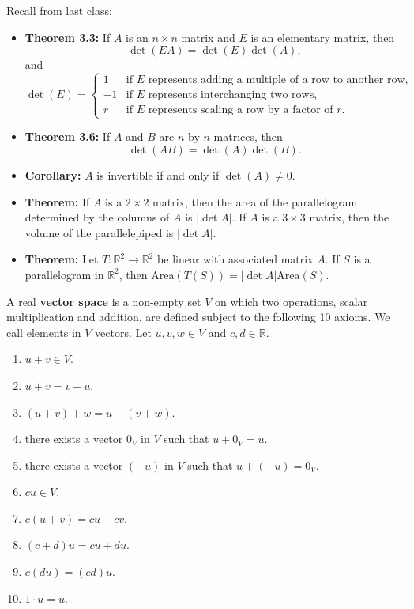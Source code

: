 \documentclass[12pt,letterpaper]{article}
\begin{document}
\thispagestyle{fancy}

Recall from last class:

\begin{itemize}
\item {\bf Theorem 3.3:} If $A$ is an $n\times n$ matrix and $E$ is an elementary matrix, then $$\operatorname{det}(EA)=\operatorname{det}(E) \operatorname{det}(A),$$ and 
$$\operatorname{det}(E)=\begin{cases}
1 & \text{if $E$ represents adding a multiple of a row to another row,}\\
-1 & \text{if $E$ represents interchanging two rows,}\\
r & \text{if $E$ represents scaling a row by a factor of $r$.}
\end{cases}$$
\item {\bf Theorem 3.6:} If $A$ and $B$ are $n$ by $n$ matrices, then $$\operatorname{det}(AB)=\operatorname{det}(A)\operatorname{det}(B).$$
\item {\bf Corollary:} $A$ is invertible if and only if $\operatorname{det}(A)\neq0$.
\item {\bf Theorem:} If $A$ is a $2 \times 2$ matrix, then the area of the parallelogram determined by the columns of $A$ is $|\det{A}|$. If $A$ is a $3 \times 3$ matrix, then the volume of the parallelepiped is $|\det{A}|$.
\item {\bf Theorem:} Let $T: \mathbb{R}^2 \to \mathbb{R}^2$ be linear with associated matrix $A$. If $S$ is a parallelogram in $\mathbb{R}^2$, then $\text{Area}(T(S))=|\det{A}|\text{Area}(S)$. 
\end{itemize}

\newpage

\begin{defn}
A real {\bf vector space} is a non-empty set $V$ on which two operations, scalar multiplication and addition, are defined subject to the following 10 axioms. We call elements in $V$ vectors. Let $u,v,w \in V$ and $c,d\in \mathbb{R}$.
\begin{enumerate}
\item $u+v \in V$.
\item $u+v=v+u$.
\item $(u+v)+w=u+(v+w)$.
\item there exists a vector $0_{V}$ in $V$ such that $u+0_{V}=u$.
\item there exists a vector $(-u)$ in $V$ such that $u+(-u)=0_{V}$.
\item $cu \in V$.
\item $c(u+v)=cu+cv$.
\item $(c+d)u=cu+du$.
\item $c(du)=(cd)u$.
\item $1\cdot u =u$.
\end{enumerate}
\end{defn}
\end{document}
